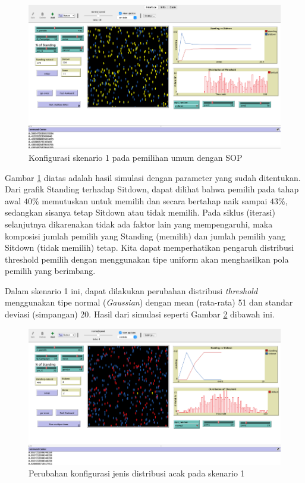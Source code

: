 \begin{figure}[H]
\centering
\includegraphics[width=\linewidth]{images/ch03/pemilusop2}
\caption{Konfigurasi skenario 1 pada pemilihan umum dengan SOP}
\label{fig:pemilusop2}
\end{figure}

Gambar \ref{fig:pemilusop2} diatas adalah hasil simulasi dengan parameter yang sudah ditentukan. Dari grafik Standing terhadap Sitdown, dapat dilihat bahwa pemilih pada tahap awal $40\%$ memutuskan untuk memilih dan secara bertahap naik sampai $43\%$, sedangkan sisanya tetap Sitdown atau tidak memilih. Pada siklus (iterasi) selanjutnya dikarenakan tidak ada faktor lain yang mempengaruhi, maka komposisi jumlah pemilih yang Standing (memilih) dan jumlah pemilih yang Sitdown (tidak memilih) tetap. Kita dapat memperhatikan pengaruh distribusi threshold pemilih dengan menggunakan tipe uniform akan menghasilkan pola pemilih yang berimbang.

Dalam skenario 1 ini, dapat dilakukan perubahan distribusi \textit{threshold} menggunakan tipe normal (\textit{Gaussian}) dengan mean (rata-rata) 51 dan standar deviasi (simpangan) 20. Hasil dari simulasi seperti Gambar \ref{fig:pemilusop3} dibawah ini.

\begin{figure}[H]
\centering
\includegraphics[width=\linewidth]{images/ch03/pemilusop3}
\caption{Perubahan konfigurasi jenis distribusi acak pada skenario 1}
\label{fig:pemilusop3}
\end{figure}

